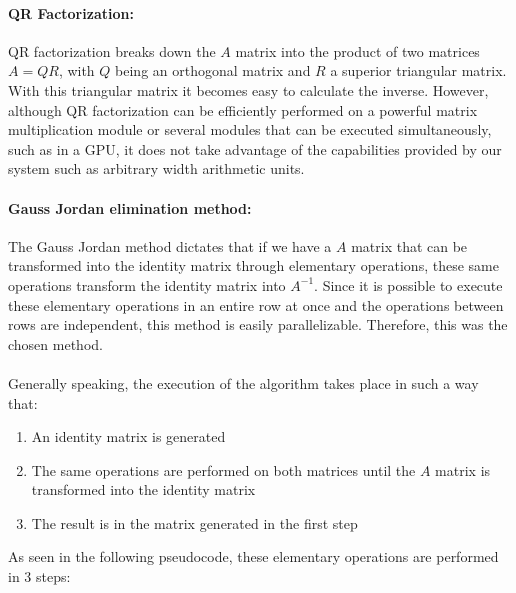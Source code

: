 \paragraph{QR Factorization\citep{alberto_oliveira_de_souza_junior_exploration_2020}:}
QR factorization breaks down the $A$ matrix into the product of two matrices $A = QR$, with $Q$ being an orthogonal matrix and $R$ a superior triangular matrix. With this triangular matrix it becomes easy to calculate the inverse. However, although QR factorization can be efficiently performed on a powerful matrix multiplication module or several modules that can be executed simultaneously, such as in a GPU, it does not take advantage of the capabilities provided by our system such as arbitrary width arithmetic units.
\paragraph{Gauss Jordan elimination method\cite{gonzalez_fpga_2016}:}
The Gauss Jordan method dictates that if we have a $A$ matrix that can be transformed into the identity matrix through elementary operations, these same operations transform the identity matrix into $A^{-1}$. Since it is possible to execute these elementary operations in an entire row at once and the operations between rows are independent, this method is easily parallelizable.
Therefore, this was the chosen method.
\\
\\
Generally speaking, the execution of the algorithm takes place in such a way that:
\begin{enumerate}
\item An identity matrix is generated
\item The same operations are performed on both matrices until the $A$ matrix is transformed into the identity matrix
\item The result is in the matrix generated in the first step
\end{enumerate}
\noindent As seen in the following pseudocode, these elementary operations are performed in 3 steps:
\\
\\
